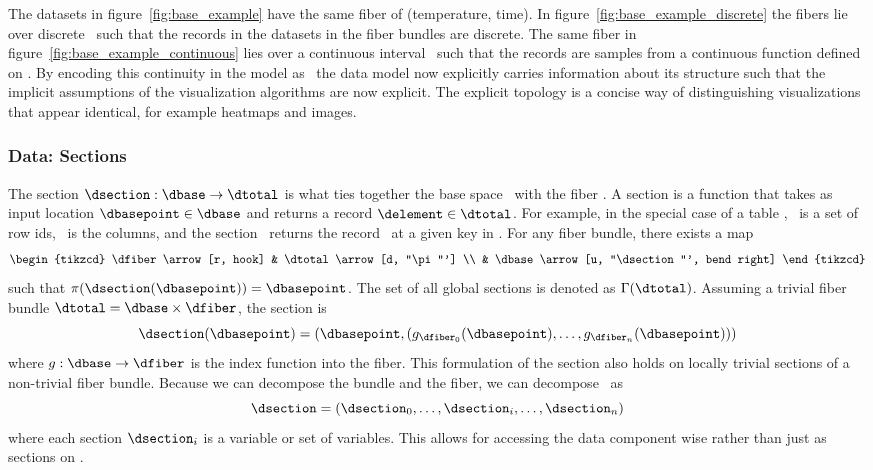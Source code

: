 \documentclass[../main.tex]{subfiles}
\begin{document}
The datasets in figure~\ref{fig:base_example} have the same fiber of (temperature, time). In figure~\ref{fig:base_example_discrete} the fibers lie over discrete \dbase\ such that the records in the datasets in the fiber bundles are discrete. The same fiber in figure~\ref{fig:base_example_continuous} lies over a continuous interval \dbase\ such that the records are samples from a continuous function defined on \dbase. By encoding this continuity in the model as \dbase\, the data model now explicitly carries information about its structure such that the implicit assumptions of the visualization algorithms are now explicit. The explicit topology is a concise way of distinguishing visualizations that appear identical, for example heatmaps and images.  
 
\subsubsection{Data: Sections \dsection}
\label{sec:data_section}
The section $\dsection: \dbase\rightarrow \dtotal$ is what ties together the base space \dbase\ with the fiber \dfiber. A section is a function that takes as input location $\dbasepoint \in \dbase$ and returns a record $\delement \in \dtotal$. For example, in the special case of a table \cite{spivakSIMPLICIALDATABASES}, \dbase\ is a set of row ids, \dfiber\ is the columns, and the section \dsection\ returns the record \delement\ at a given key in \dbase. For any fiber bundle, there exists a map
\begin{equation}
    \begin{tikzcd}
        \dfiber \arrow[r, hook] & \dtotal \arrow[d, "\pi"'] \\
                          & \dbase \arrow[u, "\dsection"', bend right]
    \end{tikzcd}
\end{equation}
 such that $\pi(\dsection(\dbasepoint)) = \dbasepoint$. The set of all global sections is denoted as $\Gamma(\dtotal)$. Assuming a trivial fiber bundle $\dtotal = \dbase \times \dfiber$, the section is 
\begin{equation}
    \label{eq:section_return}
    \dsection(\dbasepoint) = (\dbasepoint, (g_{\dfiber_{0}}(\dbasepoint), \ldots, g_{\dfiber_{n}}(\dbasepoint)))
\end{equation}
where $g: \dbase \rightarrow \dfiber$ is the index function into the fiber. This formulation of the section also holds on locally trivial sections of a non-trivial fiber bundle. Because we can decompose the bundle and the fiber, we can decompose \dsection\ as 
\begin{equation}
\label{eq:data_section_decompose}
\dsection= (\dsection_0,\ldots, \dsection_i, \dots, \dsection_n) 
\end{equation}
where each section $\dsection_i$ is a variable or set of variables. This allows for accessing the data component wise rather than just as sections on \dbase.
\end{document}
